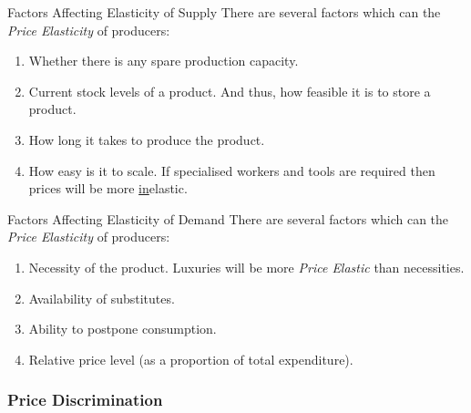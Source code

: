 \documentclass[11pt,a4paper]{article}
\begin{document}
  \begin{proposition}{Factors Affecting Elasticity of Supply}
    There are several factors which can the \textit{Price Elasticity} of producers:
    \begin{enumerate}
      \item Whether there is any spare production capacity.
      \item Current stock levels of a product. And thus, how feasible it is to store a product.
      \item How long it takes to produce the product.
      \item How easy is it to scale. If specialised workers and tools are required then prices will be more \underline{in}elastic.
    \end{enumerate}
  \end{proposition}

  \begin{proposition}{Factors Affecting Elasticity of Demand}
    There are several factors which can the \textit{Price Elasticity} of producers:
    \begin{enumerate}
      \item Necessity of the product. Luxuries will be more \textit{Price Elastic} than necessities.
      \item Availability of substitutes.
      \item Ability to postpone consumption.
      \item Relative price level (as a proportion of total expenditure).
    \end{enumerate}
  \end{proposition}

\subsubsection{Price Discrimination} \label{sec_PriceDiscrimination}
\end{document}
